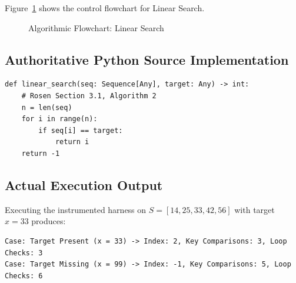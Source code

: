 \documentclass[11pt,a4paper,oneside]{report}
\theoremstyle{definition}
\begin{document}
Figure~\ref{fig:flowchart_linear} shows the control flowchart for Linear Search.

\begin{figure}[htbp]
\centering
{}
\caption{Algorithmic Flowchart: Linear Search}
\label{fig:flowchart_linear}
\end{figure}

\subsection{Authoritative Python Source Implementation}
\begin{lstlisting}[caption={Python Implementation of Linear Search (from src/algorithms/search.py)}]
def linear_search(seq: Sequence[Any], target: Any) -> int:
    # Rosen Section 3.1, Algorithm 2
    n = len(seq)
    for i in range(n):
        if seq[i] == target:
            return i
    return -1
\end{lstlisting}

\subsection{Actual Execution Output}
Executing the instrumented harness on $S = [14, 25, 33, 42, 56]$ with target $x = 33$ produces:
\begin{verbatim}
Case: Target Present (x = 33) -> Index: 2, Key Comparisons: 3, Loop Checks: 3
Case: Target Missing (x = 99) -> Index: -1, Key Comparisons: 5, Loop Checks: 6
\end{verbatim}
\end{document}
